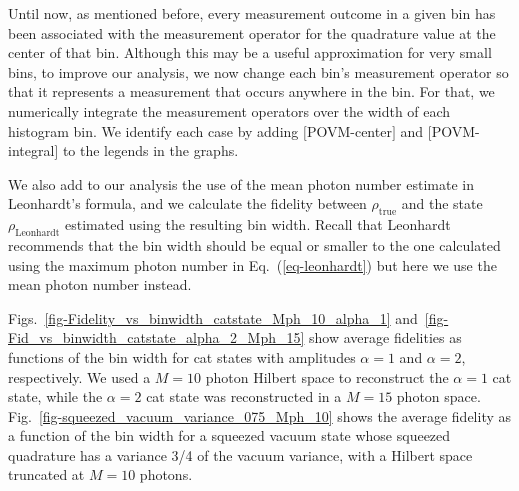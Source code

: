 \documentclass[
reprint,
superscriptaddress,
showpacs,
amsmath,
amssymb,
aps,
pra,
longbibliography
]{revtex4-1}
\newcommand{\rhotrue}{\rho_{\text{true}}}
\begin{document}



Until now, as mentioned before, every measurement outcome in a given 
bin has been associated with the measurement operator for the quadrature 
value at the center of that bin. Although this may be a useful approximation 
for very small bins, to improve our analysis, we now change each bin's
measurement operator so that it represents a measurement that occurs
anywhere in the bin. For that, we numerically integrate the measurement 
operators over the width of each histogram bin. We identify each case by 
adding $[$POVM-center$]$ and $[$POVM-integral$]$ to the legends in the
graphs.

We also add to our analysis the use of the mean photon number
estimate in Leonhardt's formula, and we calculate the fidelity
between $\rhotrue$ and the state $\rho_{\mathrm{Leonhardt}}$
estimated using the resulting bin width. Recall that Leonhardt recommends
that the bin width should be equal or smaller to the one
calculated using the maximum photon number in Eq.~(\ref{eq-leonhardt}) 
but here we use the mean photon number instead.

Figs.~\ref{fig-Fidelity_vs_binwidth_catstate_Mph_10_alpha_1}
and~\ref{fig-Fid_vs_binwidth_catstate_alpha_2_Mph_15} show average 
fidelities as functions of the bin width for cat states with 
amplitudes $\alpha=1$ and $\alpha=2$, respectively. We used a 
$M=10$ photon Hilbert space to reconstruct the $\alpha = 1$ cat state, 
while the $\alpha = 2$ cat state was reconstructed in a $M=15$ photon space. 
Fig.~\ref{fig-squeezed_vacuum_variance_075_Mph_10} shows the
average fidelity as a function of the bin width for a squeezed
vacuum state whose squeezed quadrature has a variance 3/4 of the
vacuum variance, with a Hilbert space truncated at $M=10$ photons.
\end{document}
